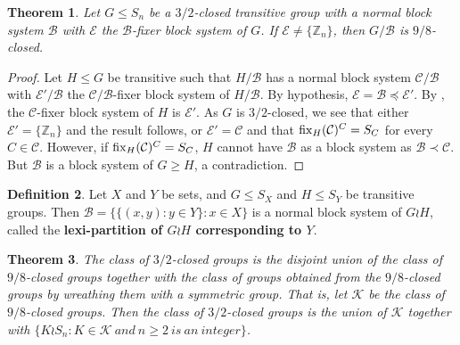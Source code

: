 \documentclass{amsart}
\newtheorem{thrm}{Theorem}[section]
\theoremstyle{definition}
\newtheorem{definition}[thrm]{Definition}
\theoremstyle{remark}
\numberwithin{equation}{section}
\def\Z{{\mathbb Z}}
\def\fix{{\rm fix}}
\def\cal{\mathcal}
\begin{document}
\begin{thrm}\label{quotient 9/8 closed}
Let $G\le S_n$ be a $3/2$-closed transitive group with a normal block system ${\cal B}$ with ${\cal E}$ the ${\cal B}$-fixer block system of $G$.  If ${\cal E}\not = \{\Z_n\}$, then $G/{\cal B}$ is $9/8$-closed.
\end{thrm}

\begin{proof}
Let $H\le G$ be transitive such that $H/{\cal B}$ has a normal block system ${\cal C}/{\cal B}$ with ${\cal E}'/{\cal B}$ the ${\cal C}/{\cal B}$-fixer block system of $H/{\cal B}$.  By hypothesis, ${\cal E} = {\cal B}\preceq{\cal E'}$.  By \cite[Lemma 2.2]{Dobson2023apreprint}, the ${\cal C}$-fixer block system of $H$ is ${\cal E}'$.  As $G$ is $3/2$-closed, we see that either ${\cal E}' = \{\Z_n\}$ and the result follows, or ${\cal E}' = {\cal C}$ and that $\fix_H({\cal C})^C = S_C$ for every $C\in{\cal C}$.  However, if $\fix_H({\cal C})^C = S_C$, $H$ cannot have ${\cal B}$ as a block system as ${\cal B}\prec{\cal C}$.  But ${\cal B}$ is a block system of $G\ge H$, a contradiction.
\end{proof}

\begin{definition}
Let $X$ and $Y$ be sets, and $G\le S_X$ and $H\le S_Y$ be transitive groups.  Then ${\cal B} = \{\{(x,y):y\in Y\}:x\in X\}$ is a normal block system of $G\wr H$, called the {\bf lexi-partition of $G\wr H$ corresponding to $Y$}.
\end{definition}

\begin{thrm}\label{3/2 structure}
The class of $3/2$-closed groups is the disjoint union of the class of $9/8$-closed groups together with the class of groups obtained from the $9/8$-closed groups by wreathing them with a symmetric group.  That is, let ${\cal K}$ be the class of $9/8$-closed groups.  Then the class of $3/2$-closed groups is the union of ${\cal K}$ together with $\{K\wr S_n:K\in{\cal K}\ and\ n\ge 2\ is\ an\ integer\}$.
\end{thrm}
\end{document}
